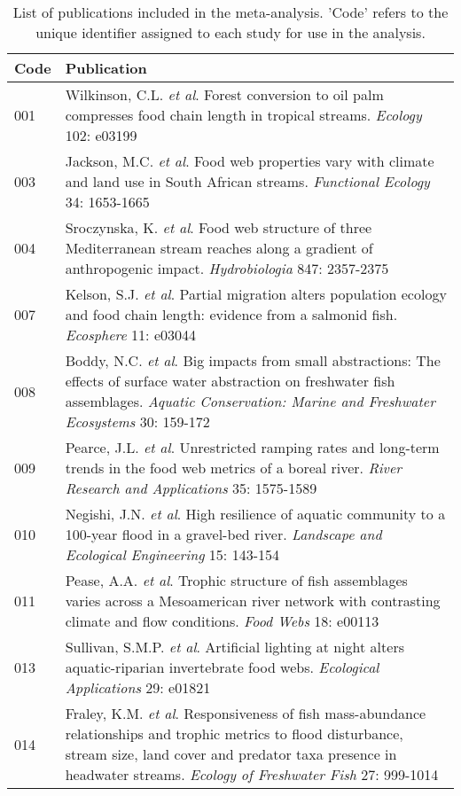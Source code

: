 \begingroup\small
\begin{longtable}{p{}p{}}
\caption{List of publications included in the meta-analysis.
             'Code' refers to the unique identifier assigned to each study for use in the analysis.
             \label{tab:meta-list}} \\ 
  \hline
Code & Publication \\ 
  \hline
001 & Wilkinson, C.L. \textit{et al}. Forest conversion to oil palm compresses food chain length in tropical streams. \textit{Ecology} 102: e03199 \\ 
  003 & Jackson, M.C. \textit{et al}. Food web properties vary with climate and land use in South African streams. \textit{Functional Ecology} 34: 1653-1665 \\ 
  004 & Sroczynska, K. \textit{et al}. Food web structure of three Mediterranean stream reaches along a gradient of anthropogenic impact. \textit{Hydrobiologia} 847: 2357-2375 \\ 
  007 & Kelson, S.J. \textit{et al}. Partial migration alters population ecology and food chain length: evidence from a salmonid fish. \textit{Ecosphere} 11: e03044 \\ 
  008 & Boddy, N.C. \textit{et al}. Big impacts from small abstractions: The effects of surface water abstraction on freshwater fish assemblages. \textit{Aquatic Conservation: Marine and Freshwater Ecosystems} 30: 159-172 \\ 
  009 & Pearce, J.L. \textit{et al}. Unrestricted ramping rates and long-term trends in the food web metrics of a boreal river. \textit{River Research and Applications} 35: 1575-1589 \\ 
  010 & Negishi, J.N. \textit{et al}. High resilience of aquatic community to a 100-year flood in a gravel-bed river. \textit{Landscape and Ecological Engineering} 15: 143-154 \\ 
  011 & Pease, A.A. \textit{et al}. Trophic structure of fish assemblages varies across a Mesoamerican river network with contrasting climate and flow conditions. \textit{Food Webs} 18: e00113 \\ 
  013 & Sullivan, S.M.P. \textit{et al}. Artificial lighting at night alters aquatic-riparian invertebrate food webs. \textit{Ecological Applications} 29: e01821 \\ 
  014 & Fraley, K.M. \textit{et al}. Responsiveness of fish mass-abundance relationships and trophic metrics to flood disturbance, stream size, land cover and predator taxa presence in headwater streams. \textit{Ecology of Freshwater Fish} 27: 999-1014 \\ 

\end{longtable}
